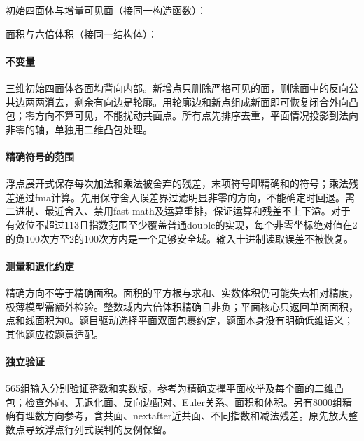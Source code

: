 \newpage

初始四面体与增量可见面（接同一构造函数）：



\newpage

面积与六倍体积（接同一结构体）：



\paragraph{不变量} 三维初始四面体各面均背向内部。新增点只删除严格可见的面，删除面中的反向公共边两两消去，剩余有向边是轮廓。用轮廓边和新点组成新面即可恢复闭合外向凸包；零方向不算可见，不能扰动共面点。所有点先排序去重，平面情况投影到法向非零的轴，单独用二维凸包处理。

\paragraph{精确符号的范围} 浮点展开式保存每次加法和乘法被舍弃的残差，末项符号即精确和的符号；乘法残差通过fma计算。先用保守舍入误差界过滤明显非零的方向，不能确定时回退。需二进制、最近舍入、禁用fast-math及运算重排，保证运算和残差不上下溢。对于有效位不超过113且指数范围至少覆盖普通double的实现，每个非零坐标绝对值在2的负100次方至2的100次方内是一个足够安全域。输入十进制读取误差不被恢复。

\paragraph{测量和退化约定} 精确方向不等于精确面积。面积的平方根与求和、实数体积仍可能失去相对精度，极薄模型需额外检验。整数域内六倍体积精确且非负；平面核心只返回单面面积，点和线面积为0。题目驱动选择平面双面包裹约定，题面本身没有明确低维语义；其他题应按题意适配。

\paragraph{独立验证} 565组输入分别验证整数和实数版，参考为精确支撑平面枚举及每个面的二维凸包；检查外向、无退化面、反向边配对、Euler关系、面积和体积。另有8000组精确有理数方向参考，含共面、nextafter近共面、不同指数和减法残差。原先放大整数点导致浮点行列式误判的反例保留。

\newpage

\Needspace{312pt}

